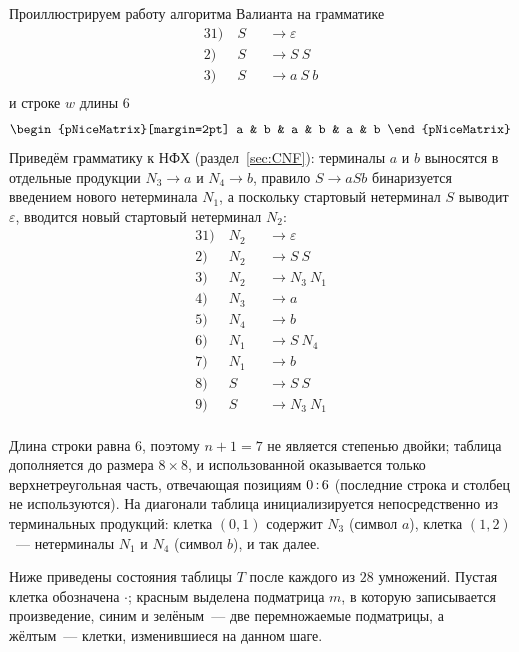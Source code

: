 \begin{example}
  \label{exmpl:Valiant}
  Проиллюстрируем работу алгоритма Валианта на грамматике
  \begin{alignat*}{3}
  1) \ & S &&\rightarrow \varepsilon \\
  2) \ & S &&\rightarrow S\ S \\
  3) \ & S &&\rightarrow a\ S\ b \\
  \end{alignat*}
  и строке $w$ длины $6$
  \[
  \begin{pNiceMatrix}[margin=2pt] a & b & a & b & a & b \end{pNiceMatrix}
  \]
  Приведём грамматику к НФХ (раздел~\ref{sec:CNF}): терминалы $a$ и $b$ выносятся в отдельные продукции $N_3 \to a$ и $N_4 \to b$, правило $S \to a S b$ бинаризуется введением нового нетерминала $N_1$, а поскольку стартовый нетерминал $S$ выводит $\varepsilon$, вводится новый стартовый нетерминал $N_2$:
  \begin{alignat*}{3}
  1) \ & N_2 &&\rightarrow \varepsilon \\
  2) \ & N_2 &&\rightarrow S\ S \\
  3) \ & N_2 &&\rightarrow N_3\ N_1 \\
  4) \ & N_3 &&\rightarrow a \\
  5) \ & N_4 &&\rightarrow b \\
  6) \ & N_1 &&\rightarrow S\ N_4 \\
  7) \ & N_1 &&\rightarrow b \\
  8) \ & S &&\rightarrow S\ S \\
  9) \ & S &&\rightarrow N_3\ N_1 \\
  \end{alignat*}

  Длина строки равна $6$, поэтому $n + 1 = 7$ не является степенью двойки; таблица дополняется до размера $8 \times 8$, и использованной оказывается только верхнетреугольная часть, отвечающая позициям $0 \rng 6$ (последние строка и столбец не используются).
  На диагонали таблица инициализируется непосредственно из терминальных продукций: клетка $(0,1)$ содержит $N_3$ (символ $a$), клетка $(1,2)$~--- нетерминалы $N_1$ и $N_4$ (символ $b$), и так далее.

  Ниже приведены состояния таблицы $T$ после каждого из $28$ умножений.
  Пустая клетка обозначена $\cdot$; красным выделена подматрица $m$, в которую записывается произведение, синим и зелёным~--- две перемножаемые подматрицы, а жёлтым~--- клетки, изменившиеся на данном шаге.


\end{example}
